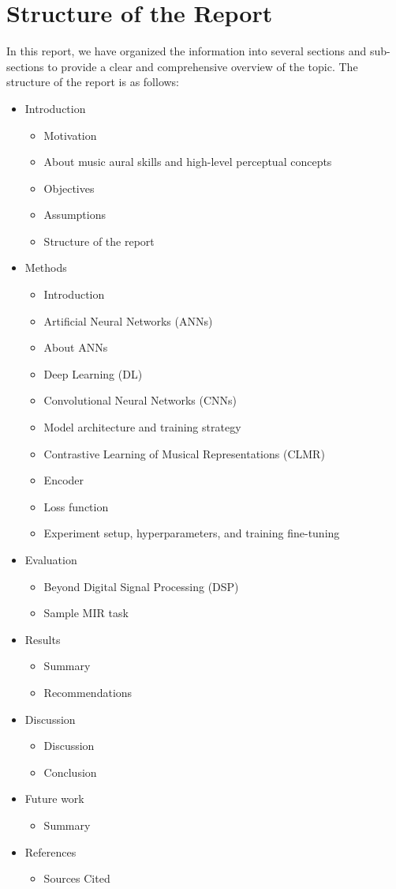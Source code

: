 \section{Structure of the Report}

In this report, we have organized the information into several sections and sub-sections to provide a clear and comprehensive overview of the topic. The structure of the report is as follows:

\begin{itemize}
\item Introduction
  \begin{itemize}
  \item Motivation
  \item About music aural skills and high-level perceptual concepts
  \item Objectives
  \item Assumptions
  \item Structure of the report
  \end{itemize}
\item Methods
  \begin{itemize}
  \item Introduction
  \item Artificial Neural Networks (ANNs)
  \item About ANNs
  \item Deep Learning (DL)
  \item Convolutional Neural Networks (CNNs)
  \item Model architecture and training strategy
  \item Contrastive Learning of Musical Representations (CLMR)
  \item Encoder
  \item Loss function
  \item Experiment setup, hyperparameters, and training fine-tuning
  \end{itemize}
\item Evaluation
  \begin{itemize}
  \item Beyond Digital Signal Processing (DSP)
  \item Sample MIR task
  \end{itemize}
\item Results
  \begin{itemize}
  \item Summary
  \item Recommendations
  \end{itemize}
\item Discussion
  \begin{itemize}
  \item Discussion
  \item Conclusion
  \end{itemize}
\item Future work
  \begin{itemize}
  \item Summary
  \end{itemize}

\item References
  \begin{itemize}
  \item Sources Cited
  \end{itemize}
\end{itemize}